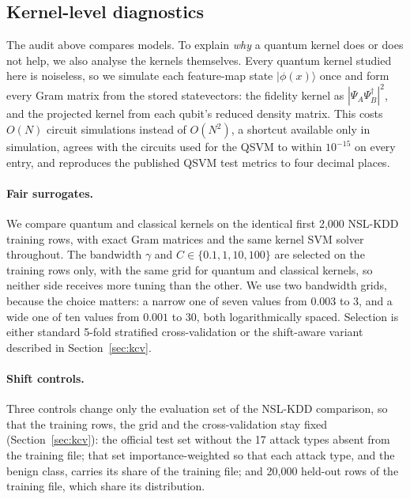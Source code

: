 \documentclass[preprint,11pt]{elsarticle}
\begin{document}
\subsection{Kernel-level diagnostics}\label{sec:kdiag}
The audit above compares models. To explain \emph{why} a quantum kernel does or does not help, we also
analyse the kernels themselves. Every quantum kernel studied here is noiseless, so we simulate each
feature-map state $|\phi(x)\rangle$ once and form every Gram matrix from the stored statevectors: the
fidelity kernel as $|\Psi_A\Psi_B^{\dagger}|^{2}$, and the projected kernel from each qubit's reduced
density matrix. This costs $O(N)$ circuit simulations instead of $O(N^{2})$, a shortcut available only in simulation, agrees with the circuits
used for the QSVM to within $10^{-15}$ on every entry, and reproduces the published QSVM test metrics to
four decimal places.

\paragraph{Fair surrogates.} We compare quantum and classical kernels on the identical first 2{,}000
NSL-KDD training rows, with exact Gram matrices and the same kernel SVM solver throughout. The bandwidth $\gamma$ and
$C\in\{0.1,1,10,100\}$ are selected on the training rows only, with the same grid for quantum and
classical kernels, so neither side receives more tuning than the other. We use two bandwidth grids,
because the choice matters: a narrow one of seven values from $0.003$ to $3$, and a wide one of ten
values from $0.001$ to $30$, both logarithmically spaced. Selection is either standard 5-fold
stratified cross-validation or the shift-aware variant described in Section~\ref{sec:kcv}.

\paragraph{Shift controls.} Three controls change only the evaluation set of the NSL-KDD comparison, so
that the training rows, the grid and the cross-validation stay fixed (Section~\ref{sec:kcv}): the
official test set without the 17 attack types absent from the training file; that set importance-weighted
so that each attack type, and the benign class, carries its share of the training file; and 20{,}000
held-out rows of the training file, which share its distribution.
\end{document}
